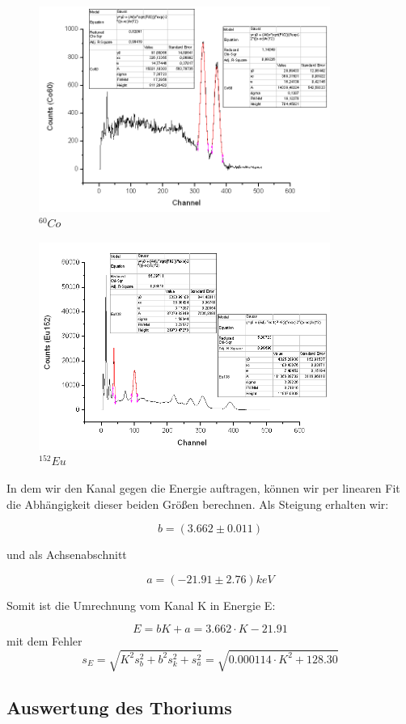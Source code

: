 \begin{figure}[H]
\centering \includegraphics[width = 0.85\textwidth]{auswertung/Co60.png}
\caption{$^{60}Co$}
\end{figure}

\begin{figure}[H]
\centering \includegraphics[width = 0.85\textwidth]{auswertung/Eu152.png}
\caption{$^{152}Eu$}
\end{figure}


In dem wir den Kanal gegen die Energie auftragen, können wir per linearen Fit die Abhängigkeit dieser beiden Größen berechnen. Als Steigung erhalten wir:

$$ b = (3.662 \pm 0.011) $$

und als Achsenabschnitt

$$ a = (-21.91 \pm 2.76) keV $$

Somit ist die Umrechnung vom Kanal K in Energie E:

$$ E = bK + a = 3.662\cdot K - 21.91 $$ 
mit dem Fehler
$$ s_E = \sqrt{K^2s_b^2 + b^2s_k^2 + s_a^2} = \sqrt{0.000114\cdot K^2 + 128.30} $$

\subsection{Auswertung des Thoriums}


























